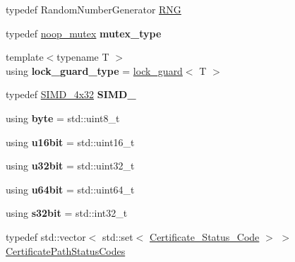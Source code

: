 \begin{DoxyCompactItemize}
\item 
typedef Random\+Number\+Generator \mbox{\hyperlink{namespace_botan_a45fbc8259840830135e2cf779839ddfa}{R\+NG}}
\item 
\mbox{\label{namespace_botan_ad384cce1c3c4736c4d48904dd6dc5061}} 
typedef \mbox{\hyperlink{class_botan_1_1noop__mutex}{noop\+\_\+mutex}} {\bfseries mutex\+\_\+type}
\item 
\mbox{\label{namespace_botan_a023d45026d17fdd648ae3d4a8b27c5ff}} 
{\footnotesize template$<$typename T $>$ }\\using {\bfseries lock\+\_\+guard\+\_\+type} = \mbox{\hyperlink{class_botan_1_1lock__guard}{lock\+\_\+guard}}$<$ T $>$
\item 
\mbox{\label{namespace_botan_ab8a59e232983349d45427890c5286c94}} 
typedef \mbox{\hyperlink{class_botan_1_1_s_i_m_d__4x32}{S\+I\+M\+D\+\_\+4x32}} {\bfseries S\+I\+M\+D\+\_}
\item 
\mbox{\label{namespace_botan_ac1a6663b490db3d485027ee7703601d0}} 
using {\bfseries byte} = std\+::uint8\+\_\+t
\item 
\mbox{\label{namespace_botan_a505815f98fab07277691987697db779b}} 
using {\bfseries u16bit} = std\+::uint16\+\_\+t
\item 
\mbox{\label{namespace_botan_a27a94f72aafbd2a2f42d4fbc33b36a42}} 
using {\bfseries u32bit} = std\+::uint32\+\_\+t
\item 
\mbox{\label{namespace_botan_a05eb3f748538b76716c6868660cb6ab3}} 
using {\bfseries u64bit} = std\+::uint64\+\_\+t
\item 
\mbox{\label{namespace_botan_a227f63d988c9a6238cca19b2c32e79f9}} 
using {\bfseries s32bit} = std\+::int32\+\_\+t
\item 
typedef std\+::vector$<$ std\+::set$<$ \mbox{\hyperlink{namespace_botan_ae1e907dc90937bdda30f65216e68ff2b}{Certificate\+\_\+\+Status\+\_\+\+Code}} $>$ $>$ \mbox{\hyperlink{namespace_botan_a013252aabcb201e0d27b60b1e690886b}{Certificate\+Path\+Status\+Codes}}
\end{DoxyCompactItemize}
